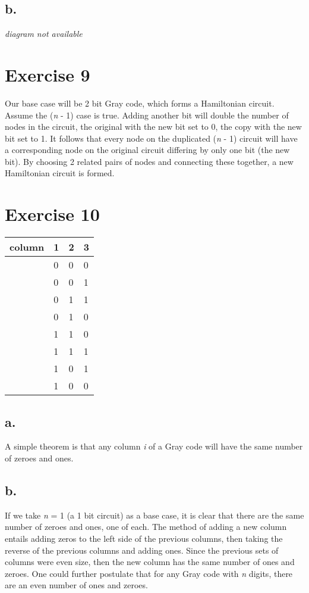 \documentclass[12pt]{article}
\begin{document}
\subsection*{b.}
\emph{diagram not available}

\section*{Exercise 9}

Our base case will be 2 bit Gray code, which forms a Hamiltonian circuit. Assume the (\emph{n} - 1) case
is true. Adding another bit will double the number of nodes in the circuit, the original with the new bit set to 0,
the copy with the new bit set to 1.  It follows that every node on the duplicated (\emph{n} - 1) circuit will have a corresponding node on the original circuit differing by only one bit (the new bit). By choosing 2 related pairs of nodes and connecting these together, a new Hamiltonian circuit is formed.

\section*{Exercise 10}
\begin{tabular}{r|l|l|l}
column & 1 & 2 & 3 \\
\hline
& 0 & 0 & 0 \\
& 0 & 0 & 1 \\
& 0 & 1 & 1 \\
& 0 & 1 & 0 \\
& 1 & 1 & 0 \\
& 1 & 1 & 1 \\
& 1 & 0 & 1 \\
& 1 & 0 & 0 \\
\end{tabular}

\subsection*{a.}
A simple theorem is that any column \emph{i} of a Gray code will have the same number of zeroes and ones.
\subsection*{b.}
If we take \emph{n} = 1 (a 1 bit circuit) as a base case, it is clear that there are the same number of
zeroes and ones, one of each. The method of adding a new column entails adding zeros to the left side of the previous columns, then taking the reverse of the previous columns and adding ones. Since the previous sets of columns were even size, then the new column has the same number of ones and zeroes.  One could further postulate that for any Gray code with \emph{n} digits, there are an even number of ones and zeroes.
\end{document}
